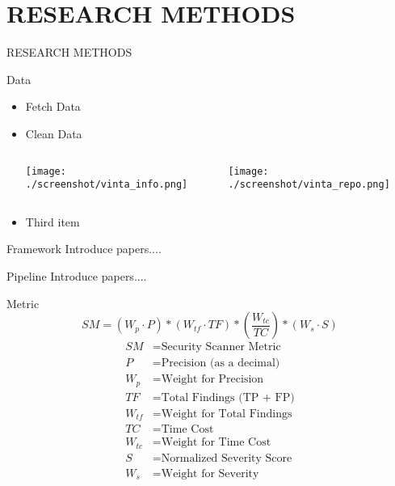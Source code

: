 \section{RESEARCH METHODS}
\begin{frame}[allowframebreaks]{RESEARCH METHODS}
  \begin{block}{Data}
    \begin{itemize}
      \item Fetch Data
      \item Clean Data
    \begin{columns}
      \centering
      \texttt{[image: ./screenshot/vinta\_info.png]}

      \centering
      \texttt{[image: ./screenshot/vinta\_repo.png]}
    \end{columns}
      
      \item Third item
    \end{itemize}  
  \end{block}
  \framebreak
  \begin{block}{Framework}
    Introduce papers....
  \end{block}
  \begin{block}{Pipeline}
    Introduce papers....
  \end{block}
  \framebreak
  \begin{block}{Metric}
    \begin{equation}
      SM = (W_p \cdot P) * (W_{tf} \cdot TF) * (\frac{W_{tc}}{TC}) * (W_s \cdot S)
    \end{equation}
    \begin{align*}
      SM & = \text{Security Scanner Metric} \\
      P & = \text{Precision (as a decimal)} \\
      W_p & = \text{Weight for Precision} \\
      TF & = \text{Total Findings (TP + FP)} \\
      W_{tf} & = \text{Weight for Total Findings} \\
      TC & = \text{Time Cost} \\
      W_{tc} & = \text{Weight for Time Cost} \\
      S & = \text{Normalized Severity Score} \\
      W_s & = \text{Weight for Severity}
    \end{align*}
  \end{block}
\end{frame}